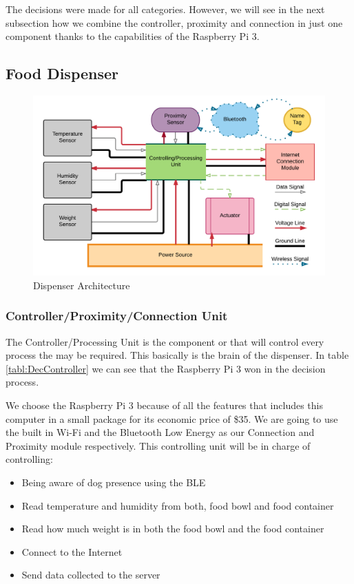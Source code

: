 \documentclass[12pt]{article}
\begin{document}
The decisions were made for all categories. However, we will see in the next subsection how we combine the controller, proximity and connection in just one component thanks to the capabilities of the Raspberry Pi 3.

\subsection{Food Dispenser}

\begin{figure}[!htb]
  \includegraphics[width=\textwidth]{Figures/ArchitectureDispenser}
  \caption{Dispenser Architecture}
  \label{fig:ArchDispenser}
\end{figure}

\subsubsection{Controller/Proximity/Connection Unit}

The Controller/Processing Unit is the component or that will control every process the may be required. This basically is the brain of the dispenser. In table \ref{tabl:DecController} we can see that the Raspberry Pi 3 won in the decision process.

We choose the Raspberry Pi 3 because of all the features that includes this computer in a small package for its economic price of \$35. We are going to use the built in Wi-Fi and the Bluetooth Low Energy as our Connection and Proximity module respectively. This controlling unit will be in charge of controlling:

\begin{itemize}
  \item Being aware of dog presence using the BLE
  \item Read temperature and humidity from both, food bowl and food container
  \item Read how much weight is in both the food bowl and the food container
  \item Connect to the Internet
  \item Send data collected to the server
\end{itemize}
\end{document}
